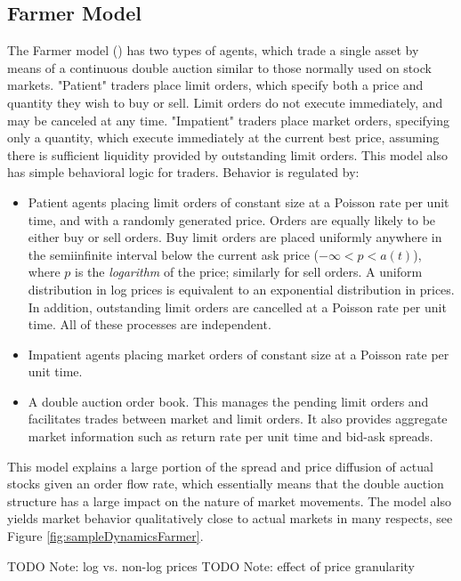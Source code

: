 \documentclass[runningheads]{llncs}
\begin{document}
\subsection{Farmer Model}
The Farmer model (\cite{farmer2003}) has two types of agents, which trade a single asset by means of a continuous double auction similar to those normally used on stock markets. "Patient" traders place limit orders, which specify both a price and quantity they wish to buy or sell. Limit orders do not execute immediately, and may be canceled at any time. "Impatient" traders place market orders, specifying only a quantity, which execute immediately at the current best price, assuming there is sufficient liquidity provided by outstanding limit orders. This model also has simple behavioral logic for traders. Behavior is regulated by:
\begin{itemize}
\item Patient agents placing limit orders of constant size at a Poisson rate per unit time, and with a randomly generated price. Orders are equally likely to be either buy or sell orders. Buy limit orders are placed uniformly anywhere in the semiinfinite interval below the current ask price ($-\infty < p < a(t)$), where $p$ is the \emph{logarithm} of the price; similarly for sell orders. A uniform distribution in log prices is equivalent to an exponential distribution in prices. In addition, outstanding limit orders are cancelled at a Poisson rate per unit time. All of these processes are independent.
\item Impatient agents placing market orders of constant size at a Poisson rate per unit time.
\item A double auction order book. This manages the pending limit orders and facilitates trades between market and limit orders. It also provides aggregate market information such as return rate per unit time and bid-ask spreads.
\end{itemize}
This model explains a large portion of the spread and price diffusion of actual stocks given an order flow rate, which essentially means that the double auction structure has a large impact on the nature of market movements. The model also yields market behavior qualitatively close to actual markets in many respects, see Figure \ref{fig:sampleDynamicsFarmer}.

TODO Note: log vs. non-log prices
TODO Note: effect of price granularity
\end{document}
